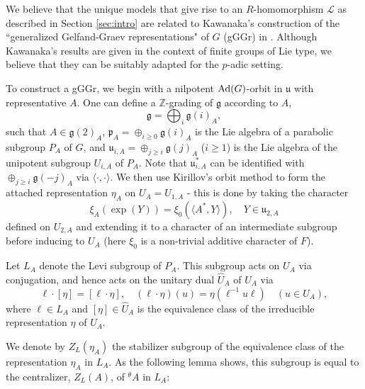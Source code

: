 \documentclass[11pt,letterpaper]{article}
\newcommand{\Z}{\mathbb{Z}}
\newcommand{\calL}{\mathcal{L}} %
\newcommand{\goth}{\mathfrak}
\newcommand{\Ad}{\textup{Ad}}
\theoremstyle{remark}
\numberwithin{equation}{section}
\begin{document}
We believe that the unique models that give rise to an $R$-homomorphism $\calL$ as described in Section \ref{sec:intro} are related to Kawanaka's construction of the ``generalized Gelfand-Graev representations" of $G$ (gGGr) in \cite{Kaw}. Although Kawanaka's results are given in the context of finite groups of Lie type, we believe that they can be suitably adapted for the $p$-adic setting. 


\begin{comment} For the moment, all notations for algebraic groups indicate points over the finite field $F= F_q$. \end{comment}
To construct a gGGr, we begin with a nilpotent $\Ad(G)$-orbit in $\goth{u}$ with representative $A$. One can define a $\Z$-grading of $\goth{g}$ according to $A$, \begin{equation} \goth{g} = \bigoplus_i \goth{g}(i)_A, \end{equation} such that $A \in \goth{g}(2)_A$, $\goth{p}_A =  \oplus_{i\geq 0} \goth{g}(i)_A$ is the Lie algebra of a parabolic subgroup $P_A$ of $G$, and $\goth{u}_{i,A} = \oplus_{j\geq i} \goth{g}(j)_A$ ($i\geq 1$) is the Lie algebra of the unipotent subgroup $U_{i,A}$ of $P_A$. Note that $\goth{u}_{i,A}^{\ast}$ can be identified with $\oplus_{j\geq i} \goth{g}(-j)_A$ via $\langle \cdot, \cdot \rangle$. We then use Kirillov's orbit method to form the attached representation $\eta_A$ on $U_A = U_{1,A}$ - this is done by taking the character \begin{equation}\xi_{A}(\exp(Y)) = \xi_0(\langle A^{\ast},Y\rangle),\quad Y \in \goth{u}_{2,A}\end{equation} defined on $U_{2,A}$ and extending it to a character of an intermediate subgroup before inducing to $U_{A}$ (here $\xi_0$ is a non-trivial additive character of $F$).

Let $L_A$ denote the Levi subgroup of $P_A$. This subgroup acts on $U_A$ via conjugation, and hence acts on the unitary dual $\widehat{U}_A$ of $U_A$ via \begin{equation} \ell \cdot [\eta] = [\ell \cdot \eta], \quad (\ell \cdot \eta)(u) = \eta(\ell^{-1}u\ell) \quad (u \in U_A),\end{equation} where $\ell \in L_A$ and $[\eta] \in \widehat{U}_A$ is the equivalence class of the irreducible representation $\eta$ of $U_A$. 

We denote by $Z_L(\eta_A)$ the stabilizer subgroup of the equivalence class of the representation $\eta_A$ in $L_A$. As the following lemma shows, this subgroup is equal to the centralizer, $Z_L(A)$, of $^{\theta}A$ in $L_A$:
\end{document}
